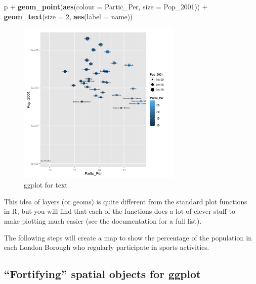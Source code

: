 \documentclass[]{article}
\newenvironment{Shaded}{}{}
\newcommand{\KeywordTok}[1]{\textcolor[rgb]{0.00,0.44,0.13}{\textbf{{#1}}}}
\newcommand{\DataTypeTok}[1]{\textcolor[rgb]{0.56,0.13,0.00}{{#1}}}
\newcommand{\DecValTok}[1]{\textcolor[rgb]{0.25,0.63,0.44}{{#1}}}
\newcommand{\NormalTok}[1]{{#1}}
\let\Oldincludegraphics\includegraphics
\renewcommand{\includegraphics}[1]{\Oldincludegraphics[width=8cm]{#1}}
\begin{document}
\begin{Shaded}
\begin{Highlighting}[]
\NormalTok{p + }\KeywordTok{geom_point}\NormalTok{(}\KeywordTok{aes}\NormalTok{(}\DataTypeTok{colour =} \NormalTok{Partic_Per, }\DataTypeTok{size =} \NormalTok{Pop_2001)) + }\KeywordTok{geom_text}\NormalTok{(}\DataTypeTok{size =} \DecValTok{2}\NormalTok{, }
    \KeywordTok{aes}\NormalTok{(}\DataTypeTok{label =} \NormalTok{name))}
\end{Highlighting}
\end{Shaded}
\begin{figure}[htbp]
\centering
\includegraphics{figure/ggplot_for_text.png}
\caption{ggplot for text}
\end{figure}

This idea of layers (or geoms) is quite different from the standard plot
functions in R, but you will find that each of the functions does a lot
of clever stuff to make plotting much easier (see the documentation for
a full list).

The following steps will create a map to show the percentage of the
population in each London Borough who regularly participate in sports
activities.

\subsection{``Fortifying'' spatial objects for ggplot}
\end{document}
